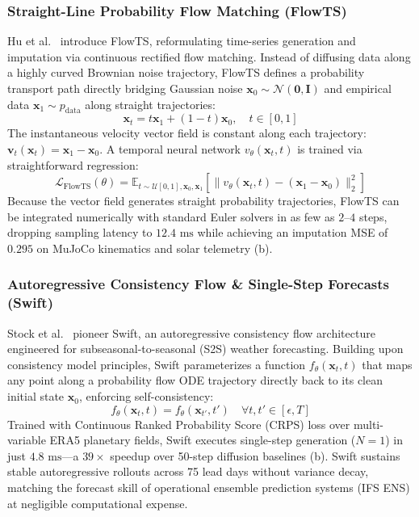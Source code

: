 \subsubsection{Straight-Line Probability Flow Matching (FlowTS)}
Hu et al.~\cite{Hu2024FlowTS} introduce FlowTS, reformulating time-series generation and imputation via continuous rectified flow matching. Instead of diffusing data along a highly curved Brownian noise trajectory, FlowTS defines a probability transport path directly bridging Gaussian noise $\mathbf{x}_0 \sim \mathcal{N}(\mathbf{0}, \mathbf{I})$ and empirical data $\mathbf{x}_1 \sim p_{\text{data}}$ along straight trajectories:
\begin{equation}
    \mathbf{x}_t = t \mathbf{x}_1 + (1 - t) \mathbf{x}_0, \quad t \in [0, 1]
\end{equation}
The instantaneous velocity vector field is constant along each trajectory: $\mathbf{v}_t(\mathbf{x}_t) = \mathbf{x}_1 - \mathbf{x}_0$. A temporal neural network $v_\theta(\mathbf{x}_t, t)$ is trained via straightforward regression:
\begin{equation}
    \mathcal{L}_{\text{FlowTS}}(\theta) = \mathbb{E}_{t \sim \mathcal{U}[0, 1], \mathbf{x}_0, \mathbf{x}_1} \left[ \|v_\theta(\mathbf{x}_t, t) - (\mathbf{x}_1 - \mathbf{x}_0)\|_2^2 \right]
\end{equation}
Because the vector field generates straight probability trajectories, FlowTS can be integrated numerically with standard Euler solvers in as few as $2$--$4$ steps, dropping sampling latency to $12.4\text{ ms}$ while achieving an imputation MSE of $0.295$ on MuJoCo kinematics and solar telemetry (b).

\subsubsection{Autoregressive Consistency Flow \& Single-Step Forecasts (Swift)}
Stock et al.~\cite{Stock2025Swift} pioneer Swift, an autoregressive consistency flow architecture engineered for subseasonal-to-seasonal (S2S) weather forecasting. Building upon consistency model principles, Swift parameterizes a function $f_\theta(\mathbf{x}_t, t)$ that maps any point along a probability flow ODE trajectory directly back to its clean initial state $\mathbf{x}_0$, enforcing self-consistency:
\begin{equation}
    f_\theta(\mathbf{x}_t, t) = f_\theta(\mathbf{x}_{t'}, t') \quad \forall t, t' \in [\epsilon, T]
\end{equation}
Trained with Continuous Ranked Probability Score (CRPS) loss over multi-variable ERA5 planetary fields, Swift executes single-step generation ($N=1$) in just $4.8\text{ ms}$—a $39\times$ speedup over 50-step diffusion baselines (b). Swift sustains stable autoregressive rollouts across 75 lead days without variance decay, matching the forecast skill of operational ensemble prediction systems (IFS ENS) at negligible computational expense.

